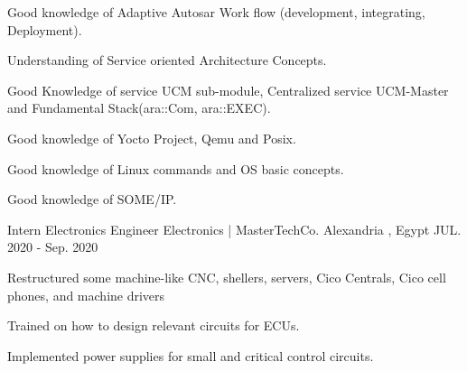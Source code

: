 \begin{cventries}
{\begin{cvitems}
        \item {\normalsize Good knowledge of Adaptive Autosar Work flow (development, integrating, Deployment).}
        \item {\normalsize Understanding of Service oriented Architecture Concepts.}
        \item {\normalsize Good Knowledge of service UCM sub-module, Centralized service UCM-Master and Fundamental Stack(ara::Com, ara::EXEC).}
        \item {\normalsize Good knowledge of Yocto Project, Qemu and Posix.}
        \item {\normalsize Good knowledge of Linux commands and OS basic concepts.}
        \item{\normalsize Good knowledge of SOME/IP.}
      \end{cvitems}
    }
  \cventry
    {\normalsize Intern Electronics Engineer} %
    {\newline \Large Electronics | \color{blue}MasterTechCo.} %
    {\normalsize Alexandria , Egypt} %
    {\normalsize JUL. 2020 - Sep. 2020} %
    {
      \begin{cvitems} %
        \item{\normalsize Restructured some machine-like CNC, shellers, servers, Cico Centrals, Cico cell phones, and machine drivers}
        \item{\normalsize Trained on how to design relevant circuits for ECUs.}
        \item{\normalsize Implemented power supplies for small and critical control circuits.}
      \end{cvitems}
    }
\end{cventries}
